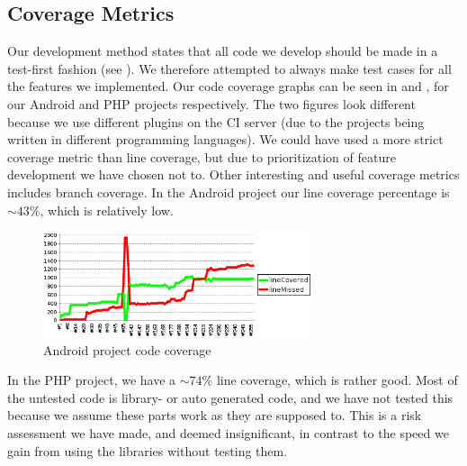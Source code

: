 
\subsection{Coverage Metrics}
\label{sec:automated_unit_test}

Our development method states that all code we develop should be made in a test-first fashion (see ). We therefore attempted to always make test cases for all the features we implemented. Our code coverage graphs can be seen in  and , for our Android and PHP projects respectively. The two figures look different because we use different plugins on the CI server (due to the projects being written in different programming languages). We could have used a more strict coverage metric than line coverage, but due to prioritization of feature development we have chosen not to. Other interesting and useful coverage metrics includes branch coverage. In the Android project our line coverage percentage is $\sim 43\%$, which is relatively low. %


\begin{figure}[!htbp]
    \centering
    \includegraphics[width=0.7\textwidth]{graphic/quality_assurance/jenkins_android_code_coverage}
    \caption{Android project code coverage}
    \label{fig:android_project_code_coverage}
\end{figure}
\FloatBarrier

In the PHP project, we have a $\sim 74\%$ line coverage, which is rather good. Most of the untested code is library- or auto generated code, and we have not tested this because we assume these parts work as they are supposed to. This is a risk assessment we have made, and deemed insignificant, in contrast to the speed we gain from using the libraries without testing them. %

